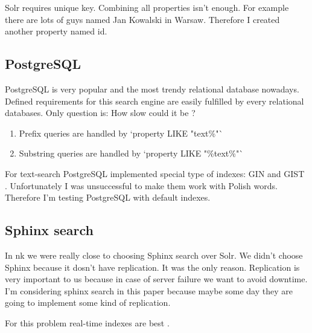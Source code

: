 \documentclass[10pt,a4paper]{article}
\begin{document}
Solr requires unique key. Combining all properties isn't enough. For example there are lots of guys named Jan Kowalski in Warsaw. Therefore I created another property named id.

\subsection{PostgreSQL}

PostgreSQL is very popular and the most trendy relational database nowadays. Defined requirements for this search engine are easily fulfilled by every relational databases. Only question is: How slow could it be ?

\begin{enumerate}
\item Prefix queries are handled by `property LIKE "text\%"`
\item Substring queries are handled by `property LIKE "\%text\%"`
\end{enumerate}

For text-search PostgreSQL implemented special type of indexes: GIN \cite{PSQLGIN} and GIST \cite{PSQLGIST}. Unfortunately I was unsuccessful to make them work with Polish words. Therefore I'm testing PostgreSQL with default indexes.

\subsection{Sphinx search}

In nk we were really close to choosing Sphinx search over Solr. We didn't choose Sphinx because it dosn't have replication. It was the only reason. Replication is very important to us because in case of server failure we want to avoid downtime. I'm considering sphinx search in this paper because maybe some day they are going to implement some kind of replication.

For this problem real-time indexes are best \cite{SPHINXRT}.

\end{document}
